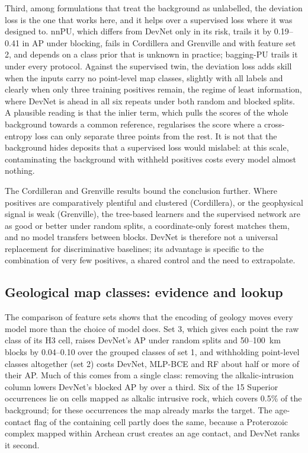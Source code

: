 \documentclass[pdflatex,sn-apa]{sn-jnl}
\begin{document}
Third, among formulations that treat the background as unlabelled, the deviation loss is the one that works here, and it helps over a supervised loss where it was designed to. nnPU, which differs from DevNet only in its risk, trails it by 0.19--0.41 in AP under blocking, fails in Cordillera and Grenville and with feature set 2, and depends on a class prior that is unknown in practice; bagging-PU trails it under every protocol. Against the supervised twin, the deviation loss adds skill when the inputs carry no point-level map classes, slightly with all labels and clearly when only three training positives remain, the regime of least information, where DevNet is ahead in all six repeats under both random and blocked splits. A plausible reading is that the inlier term, which pulls the scores of the whole background towards a common reference, regularises the score where a cross-entropy loss can only separate three points from the rest. It is not that the background hides deposits that a supervised loss would mislabel: at this scale, contaminating the background with withheld positives costs every model almost nothing.

The Cordilleran and Grenville results bound the conclusion further. Where positives are comparatively plentiful and clustered (Cordillera), or the geophysical signal is weak (Grenville), the tree-based learners and the supervised network are as good or better under random splits, a coordinate-only forest matches them, and no model transfers between blocks. DevNet is therefore not a universal replacement for discriminative baselines; its advantage is specific to the combination of very few positives, a shared control and the need to extrapolate.

\subsection{Geological map classes: evidence and lookup}\label{sec:disc-mapclasses}

The comparison of feature sets shows that the encoding of geology moves every model more than the choice of model does. Set 3, which gives each point the raw class of its H3 cell, raises DevNet's AP under random splits and 50--100~km blocks by 0.04--0.10 over the grouped classes of set 1, and withholding point-level classes altogether (set 2) costs DevNet, MLP-BCE and RF about half or more of their AP. Much of this comes from a single class: removing the alkalic-intrusion column lowers DevNet's blocked AP by over a third. Six of the 15 Superior occurrences lie on cells mapped as alkalic intrusive rock, which covers 0.5\% of the background; for these occurrences the map already marks the target. The age-contact flag of the containing cell partly does the same, because a Proterozoic complex mapped within Archean crust creates an age contact, and DevNet ranks it second.
\end{document}
